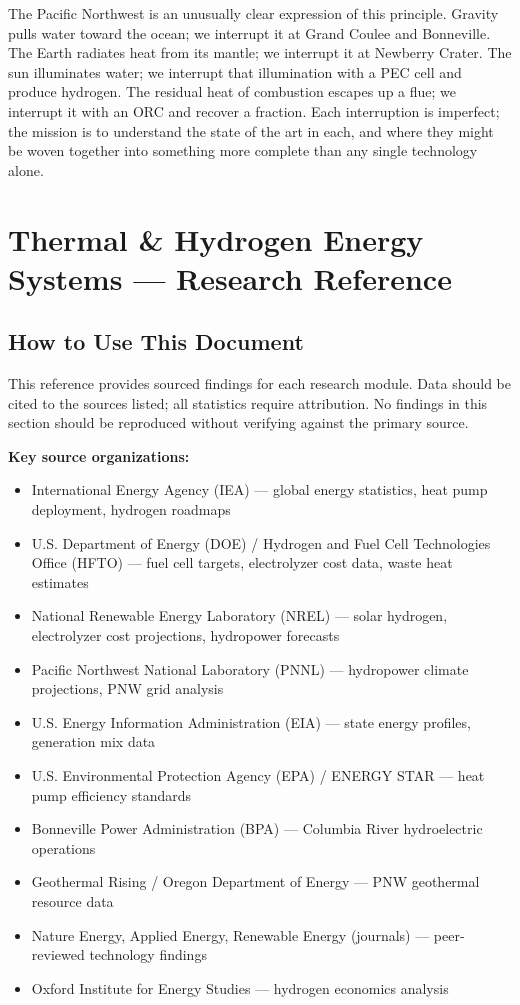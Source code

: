 \documentclass[11pt,letterpaper]{article}
\newcommand{\stageheader}[2]{%
  \noindent\colorbox{#2}{\makebox[\textwidth][l]{%
    \textcolor{white}{\bfseries\sffamily\hspace{6pt}#1\hspace{6pt}}}}%
  \vspace{0.5em}\par%
}
\begin{document}
The Pacific Northwest is an unusually clear expression of this principle. Gravity pulls water toward the ocean; we interrupt it at Grand Coulee and Bonneville. The Earth radiates heat from its mantle; we interrupt it at Newberry Crater. The sun illuminates water; we interrupt that illumination with a PEC cell and produce hydrogen. The residual heat of combustion escapes up a flue; we interrupt it with an ORC and recover a fraction. Each interruption is imperfect; the mission is to understand the state of the art in each, and where they might be woven together into something more complete than any single technology alone.

\newpage

\stageheader{STAGE 2 --- RESEARCH REFERENCE}{secondary}

\section{Thermal \& Hydrogen Energy Systems --- Research Reference}

\subsection{How to Use This Document}

This reference provides sourced findings for each research module. Data should be cited to the sources listed; all statistics require attribution. No findings in this section should be reproduced without verifying against the primary source.

\textbf{Key source organizations:}
\begin{itemize}
  \item International Energy Agency (IEA) — global energy statistics, heat pump deployment, hydrogen roadmaps
  \item U.S. Department of Energy (DOE) / Hydrogen and Fuel Cell Technologies Office (HFTO) — fuel cell targets, electrolyzer cost data, waste heat estimates
  \item National Renewable Energy Laboratory (NREL) — solar hydrogen, electrolyzer cost projections, hydropower forecasts
  \item Pacific Northwest National Laboratory (PNNL) — hydropower climate projections, PNW grid analysis
  \item U.S. Energy Information Administration (EIA) — state energy profiles, generation mix data
  \item U.S. Environmental Protection Agency (EPA) / ENERGY STAR — heat pump efficiency standards
  \item Bonneville Power Administration (BPA) — Columbia River hydroelectric operations
  \item Geothermal Rising / Oregon Department of Energy — PNW geothermal resource data
  \item Nature Energy, Applied Energy, Renewable Energy (journals) — peer-reviewed technology findings
  \item Oxford Institute for Energy Studies — hydrogen economics analysis
\end{itemize}
\end{document}
